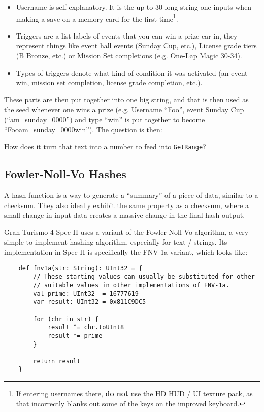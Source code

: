\documentclass[12pt,a4paper,notitlepage]{extarticle}
\begin{document}
        \begin{itemize}
            \item Username is self-explanatory. It is the up to 30-long string one inputs when
            making a save on a memory card for the first time\footnote{If entering usernames
            there, \textbf{do not} use the HD HUD / UI texture pack, as that incorrectly blanks
            out some of the keys on the improved keyboard.}.
            \item Triggers are a list labels of events that you can win a prize car in, they
            represent things like event hall events (Sunday Cup, etc.), License grade tiers (B
            Bronze, etc.) or Mission Set completions (e.g. One-Lap Magic 30-34).
            \item Types of triggers denote what kind of condition it was activated (an event
            win, mission set completion, license grade completion, etc.).
        \end{itemize}

        \noindent These parts are then put together into one big string, and that is then used
        as the seed whenever one wins a prize (e.g. Username ``Foo'', event Sunday Cup
        (``am\_sunday\_0000'') and type ``win'' is put together to become
        ``Fooam\_sunday\_0000win''). The question is then:

        \begin{center}
            How does it turn that text into a number to feed into \texttt{GetRange}?
        \end{center}

        \subsection*{Fowler-Noll-Vo Hashes}
            A hash function is a way to generate a ``summary'' of a piece of data, similar to
            a checksum. They also ideally exhibit the same property as a checksum, where a
            small change in input data creates a massive change in the final hash output.

            Gran Turismo 4 Spec II uses a variant of the Fowler-Noll-Vo algorithm, a very simple
            to implement hashing algorithm, especially for text / strings. Its implementation
            in Spec II is specifically the FNV-1a variant, which looks like:

            \begin{lstlisting}
    def fnv1a(str: String): UInt32 = {
        // These starting values can usually be substituted for other
        // suitable values in other implementations of FNV-1a.
        val prime: UInt32  = 16777619
        var result: UInt32 = 0x811C9DC5

        for (chr in str) {
            result ^= chr.toUInt8
            result *= prime
        }

        return result
    }
            \end{lstlisting}
\end{document}
